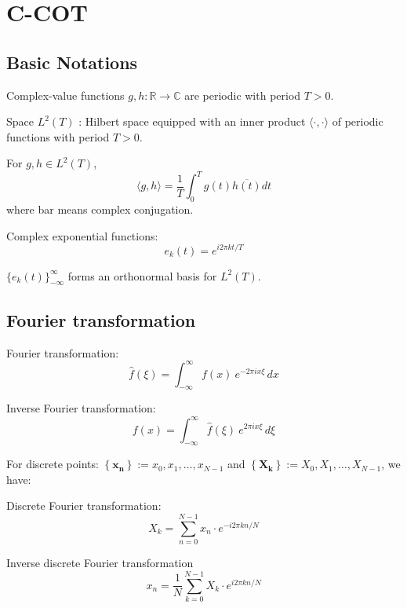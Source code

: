 \documentclass[12pt]{article}
\numberwithin{equation}{section}
\begin{document}
\section{C-COT \citep{DanelljanECCV2016}}
\subsection{Basic Notations}
Complex-value functions $g, h: \mathbb{R} \rightarrow \mathbb{C}$ are periodic with period $T > 0$. \par
Space $L^2(T)$ : Hilbert space equipped with an inner product $\langle \cdot , \cdot \rangle$ of periodic functions with period $T>0$. \par
For $g, h \in L^2(T)$, 
\begin{equation}\label{eq:conj}
	\langle g,h \rangle = \frac{1}{T} \int^{T}_{0} g(t) \overline{h(t)} dt
\end{equation}
where bar means complex conjugation. \par
Complex exponential functions: 
\begin{equation}
	e_k(t) = e^{i 2\pi kt/T}
\end{equation} \par
$\{e_k(t)\}^{\infty}_{-\infty}$ forms an orthonormal basis for $L^2(T)$. \par

\subsection{Fourier transformation}
Fourier transformation:
\begin{equation}\label{eq:fourierTrans}
	\hat{f}(\xi) = \int_{-\infty}^{\infty} f(x)\ e^{-2\pi i x \xi}\,dx
\end{equation} \par
Inverse Fourier transformation: 
\begin{equation}
	f(x) = \int_{-\infty}^{\infty} \hat f(\xi)\ e^{2 \pi i x \xi}\,d\xi
\end{equation} \par

For discrete points: $\left \{ \mathbf{ x_n } \right \} := x_0, x_1, \ldots, x_{N-1}$ and 
$\left \{ \mathbf{X_k} \right \} := X_0, X_1, \ldots, X_{N-1}$, we have: \par
Discrete Fourier transformation: 
\begin{equation}\label{eq:fourierdisc}
	X_k = \sum_{n=0}^{N-1} x_n \cdot e^{-i2\pi kn/N}
\end{equation} \par
Inverse discrete Fourier transformation
\begin{equation}
x_n = \frac{1}{N}\sum_{k=0}^{N-1}X_k \cdot e^{i 2 \pi kn/N} 
\end{equation} \par 
\end{document}
